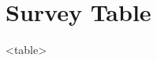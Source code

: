 \section*{Survey Table}
{
\footnotesize
\setlength{\tabcolsep}{3pt}

\begin{adjustbox}{center}
<table>
\end{adjustbox}

}